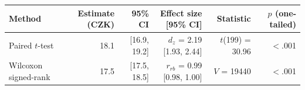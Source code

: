 \begin{tabular}{lrrrrr}
  \toprule
Method & Estimate (CZK) & 95\% CI & Effect size [95\% CI] & Statistic & $p$ (one-tailed) \\ 
  \midrule
Paired $t$-test & 18.1 & [16.9, 19.2] & $d_z$ = 2.19 [1.93, 2.44] & $t$(199) = 30.96 & $<$.001 \\ 
  Wilcoxon signed-rank & 17.5 & [17.5, 18.5] & $r_{rb}$ = 0.99 [0.98, 1.00] & $V$ = 19440 & $<$.001 \\ 
   \bottomrule
\end{tabular}
